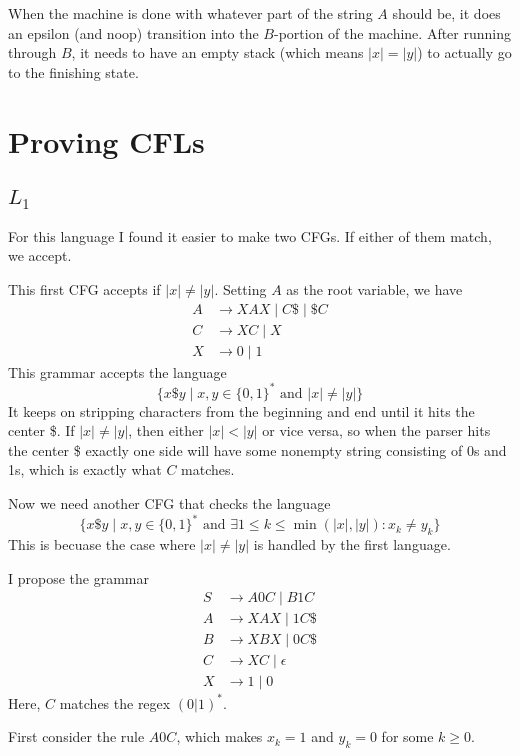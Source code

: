 \documentclass[12pt]{article}
\begin{document}
When the machine is done with whatever part of the string $A$ should be,
it does an epsilon (and noop) transition into the $B$-portion of the machine.
After running through $B$, it needs to have an empty stack (which means $|x|=|y|$)
to actually go to the finishing state.

\pagebreak

\section{Proving CFLs}

\subsection{\texorpdfstring{$L_1$}{L\_1}}

For this language I found it easier to make two CFGs.
If either of them match, we accept.

This first CFG accepts if $|x| \ne |y|$.
Setting $A$ as the root variable, we have
\begin{align*}
    A & \to XAX \mid C\$ \mid \$C \\
    C & \to XC \mid X             \\
    X & \to 0 \mid 1
\end{align*}
This grammar accepts the language
\[\{x\$y \mid x, y \in \{0, 1\}^* \text{ and } |x| \ne |y|\}\]
It keeps on stripping characters from the beginning and end until it hits the center \$.
If $|x| \ne |y|$, then either $|x| < |y|$ or vice versa,
so when the parser hits the center \$ exactly one side will have some
nonempty string consisting of 0s and 1s, which is exactly what $C$ matches.

Now we need another CFG that checks the language
\[\{x\$y \mid x, y \in \{0, 1\}^* \text{ and } \exists 1 \le k \le \min(|x|, |y|): x_k \ne y_k\}\]
This is becuase the case where $|x| \ne |y|$ is handled by the first language.

I propose the grammar
\begin{align*}
    S & \to A0C \mid B1C     \\
    A & \to XAX \mid 1C\$    \\
    B & \to XBX \mid 0C\$    \\
    C & \to XC \mid \epsilon \\
    X & \to 1 \mid 0
\end{align*}
Here, $C$ matches the regex $(0|1)^*$.

First consider the rule $A0C$, which makes $x_k=1$ and $y_k=0$ for some $k \ge 0$.
\end{document}
